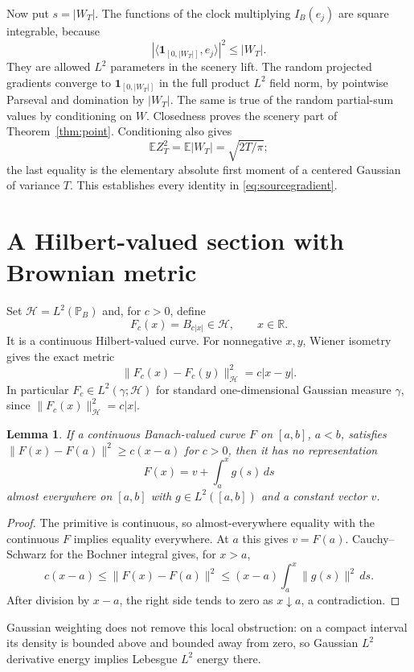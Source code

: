\documentclass[11pt]{article}
\newtheorem{lemma}[theorem]{Lemma}
\newcommand{\R}{\mathbb R}\newcommand{\E}{\mathbb E}
\newcommand{\Hh}{\mathcal H}\newcommand{\code}[1]{{\small\nolinkurl{#1}}}
\begin{document}
Now put $s=|W_T|$. The functions of the clock multiplying
$I_B(e_j)$ are square integrable, because
\[
 |\langle\mathbf1_{[0,|W_T|]},e_j\rangle|^2\leq|W_T|.
\]
They are allowed $L^2$ parameters in the scenery lift.
The random projected gradients converge to
$\mathbf1_{[0,|W_T|]}$ in the full product $L^2$ field
norm, by pointwise Parseval and domination by $|W_T|$.
The same is true of the random partial-sum values by
conditioning on $W$. Closedness proves the scenery
part of Theorem~\ref{thm:point}. Conditioning also gives
\[
 \E Z_T^2=\E|W_T|=\sqrt{2T/\pi};
\]
the last equality is the elementary absolute first
moment of a centered Gaussian of variance $T$.
This establishes every identity in
\eqref{eq:sourcegradient}.

\section{A Hilbert-valued section with Brownian metric}
Set $\Hh=L^2(\mathbb P_B)$ and, for $c>0$, define
\begin{equation}\label{eq:section}
 F_c(x)=B_{c|x|}\in\Hh,\qquad x\in\R.
\end{equation}
It is a continuous Hilbert-valued curve. For nonnegative
$x,y$, Wiener isometry gives the exact metric
\begin{equation}\label{eq:metric}
 \|F_c(x)-F_c(y)\|_{\Hh}^2=c|x-y|.
\end{equation}
In particular $F_c\in L^2(\gamma;\Hh)$ for standard
one-dimensional Gaussian measure $\gamma$, since
$\|F_c(x)\|_{\Hh}^2=c|x|$.

\begin{lemma}\label{lem:energy}
If a continuous Banach-valued curve $F$ on $[a,b]$,
$a<b$, satisfies
$\|F(x)-F(a)\|^2\geq c(x-a)$ for $c>0$,
then it has no representation
\[
 F(x)=v+\int_a^xg(s)\,ds
\]
almost everywhere on $[a,b]$ with $g\in L^2([a,b])$
and a constant vector $v$.
\end{lemma}
\begin{proof}
The primitive is continuous, so almost-everywhere
equality with the continuous $F$ implies equality
everywhere. At $a$ this gives $v=F(a)$.
Cauchy--Schwarz for the Bochner integral gives, for $x>a$,
\[
 c(x-a)\leq\|F(x)-F(a)\|^2
 \leq(x-a)\int_a^x\|g(s)\|^2\,ds.
\]
After division by $x-a$, the right side tends to zero
as $x\downarrow a$, a contradiction.
\end{proof}

Gaussian weighting does not remove this local
obstruction: on a compact interval its density is
bounded above and bounded away from zero, so Gaussian
$L^2$ derivative energy implies Lebesgue $L^2$ energy
there.
\end{document}

